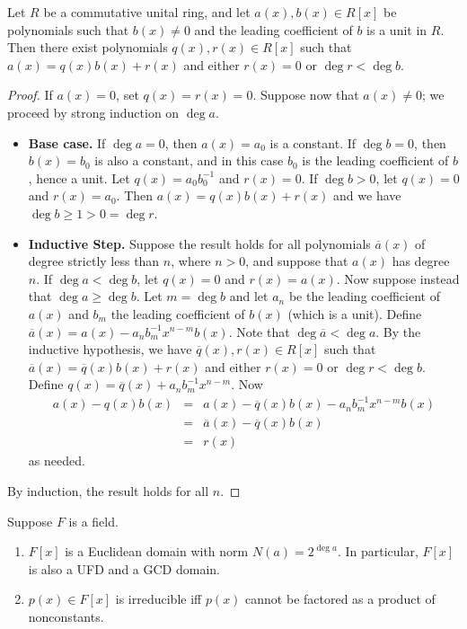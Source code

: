 \documentclass{article}
\begin{document}

\begin{prop}
Let $R$ be a commutative unital ring, and let $a(x), b(x) \in R[x]$ be polynomials such that $b(x) \neq 0$ and the leading coefficient of $b$ is a unit in $R$. Then there exist polynomials $q(x), r(x) \in R[x]$ such that $a(x) = q(x)b(x) + r(x)$ and either $r(x) = 0$ or $\deg{r} < \deg{b}$.
\end{prop}

\begin{proof}
If $a(x) = 0$, set $q(x) = r(x) = 0$. Suppose now that $a(x) \neq 0$; we proceed by strong induction on $\deg{a}$.
\begin{itemize}
\item \textbf{Base case.} If $\deg{a} = 0$, then $a(x) = a_0$ is a constant. If $\deg{b} = 0$, then $b(x) = b_0$ is also a constant, and in this case $b_0$ is the leading coefficient of $b$, hence a unit. Let $q(x) = a_0b_0^{-1}$ and $r(x) = 0$. If $\deg{b} > 0$, let $q(x) = 0$ and $r(x) = a_0$. Then $a(x) = q(x)b(x) + r(x)$ and we have $\deg{b} \geq 1 > 0 = \deg{r}$.
\item \textbf{Inductive Step.} Suppose the result holds for all polynomials $\overline{a}(x)$ of degree strictly less than $n$, where $n > 0$, and suppose that $a(x)$ has degree $n$. If $\deg{a} < \deg{b}$, let $q(x) = 0$ and $r(x) = a(x)$. Now suppose instead that $\deg{a} \geq \deg{b}$. Let $m = \deg{b}$ and let $a_n$ be the leading coefficient of $a(x)$ and $b_m$ the leading coefficient of $b(x)$ (which is a unit). Define $\overline{a}(x) = a(x) - a_nb_m^{-1}x^{n-m}b(x)$. Note that $\deg{\overline{a}} < \deg{a}$. By the inductive hypothesis, we have $\overline{q}(x), r(x) \in R[x]$ such that $\overline{a}(x) = \overline{q}(x)b(x) + r(x)$ and either $r(x) = 0$ or $\deg{r} < \deg{b}$. Define $q(x) = \overline{q}(x) + a_nb_m^{-1}x^{n-m}$. Now 
\begin{eqnarray*}
a(x) - q(x)b(x) & = & a(x) - \overline{q}(x)b(x) - a_nb_m^{-1}x^{n-m}b(x) \\
 & = & \overline{a}(x) - \overline{q}(x)b(x) \\
 & = & r(x)
\end{eqnarray*}
as needed.
\end{itemize}
By induction, the result holds for all $n$.
\end{proof}

\begin{cor}
Suppose $F$ is a field.
\begin{enumerate}
\item $F[x]$ is a Euclidean domain with norm $N(a) = 2^{\deg{a}}$. In particular, $F[x]$ is also a UFD and a GCD domain.
\item $p(x) \in F[x]$ is irreducible iff $p(x)$ cannot be factored as a product of nonconstants.
\end{enumerate}
\end{cor}
\end{document}
